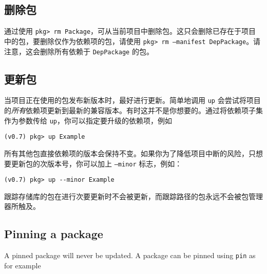\hypertarget{11999055779830288138}{}


\subsection{删除包}



通过使用 \texttt{pkg> rm Package}，可从当前项目中删除包。这只会删除已存在于项目中的包，要删除仅作为依赖项的包，请使用 \texttt{pkg> rm --manifest DepPackage}。请注意，这会删除所有依赖于 \texttt{DepPackage} 的包。



\hypertarget{682348977546152420}{}


\subsection{更新包}



当项目正在使用的包发布新版本时，最好进行更新。简单地调用 \texttt{up} 会尝试将项目的\emph{所有}依赖项更新到最新的兼容版本。有时这并不是你想要的。通过将依赖项子集作为参数传给 \texttt{up}，你可以指定要升级的依赖项，例如




\begin{lstlisting}
(v0.7) pkg> up Example
\end{lstlisting}



所有其他包直接依赖项的版本会保持不变。如果你为了降低项目中断的风险，只想要更新包的次版本号，你可以加上 \texttt{--minor} 标志，例如：




\begin{lstlisting}
(v0.7) pkg> up --minor Example
\end{lstlisting}



跟踪存储库的包在进行次要更新时不会被更新，而跟踪路径的包永远不会被包管理器所触及。



\hypertarget{2188017839608631681}{}


\subsection{Pinning a package}



A pinned package will never be updated. A package can be pinned using \texttt{pin} as for example




